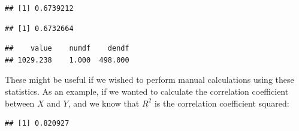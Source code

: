 \documentclass[]{book}
\newenvironment{Shaded}{\begin{snugshade}}{\end{snugshade}}
\newcommand{\KeywordTok}[1]{\textcolor[rgb]{0.13,0.29,0.53}{\textbf{#1}}}
\newcommand{\CommentTok}[1]{\textcolor[rgb]{0.56,0.35,0.01}{\textit{#1}}}
\newcommand{\OperatorTok}[1]{\textcolor[rgb]{0.81,0.36,0.00}{\textbf{#1}}}
\newcommand{\NormalTok}[1]{#1}
\theoremstyle{definition}
\theoremstyle{definition}
\theoremstyle{definition}
\theoremstyle{remark}
\begin{document}
\begin{verbatim}
## [1] 0.6739212
\end{verbatim}

\begin{Shaded}
\end{Shaded}

\begin{verbatim}
## [1] 0.6732664
\end{verbatim}

\begin{Shaded}
\end{Shaded}

\begin{verbatim}
##    value    numdf    dendf 
## 1029.238    1.000  498.000
\end{verbatim}

These might be useful if we wished to perform manual calculations using
these statistics. As an example, if we wanted to calculate the
correlation coefficient between \(X\) and \(Y\), and we know that
\(R^2\) is the correlation coefficient squared:

\begin{Shaded}
\end{Shaded}

\begin{verbatim}
## [1] 0.820927
\end{verbatim}

\begin{Shaded}
\end{Shaded}
\end{document}
